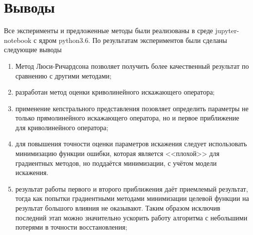 \section{Выводы}
Все эксперименты и предложенные методы были реализованы в среде jupyter-notebook с ядром python3.6. По результатам экспериментов были сделаны следующие выводы
\begin{enumerate}
	\item Метод Люси-Ричардсона позволяет получить более качественный результат по сравнению с другими методами;
	\item разработан метод оценки криволинейного искажающего оператора;
	\item применение кепстрального представления позовляет определить параметры не только прямолинейного искажающего оператора, но и первое приближение для криволинейного оператора;
	\item для повышения точности оценки параметров искажения следует использовать минимизацию функции ошибки, которая является <<плохой>> для градиентных методов, но поддаётся минимизации, с учётом модели искажения.
	\item результат работы первого и второго приближения даёт приемлемый результат, тогда как попытки градиентными методами минимизации целевой функции на результат большого влияния не оказывают. Таким образом исключив последний этап можно значительно ускорить работу алгоритма с небольшими потерями в точности восстановления;
\end{enumerate}
